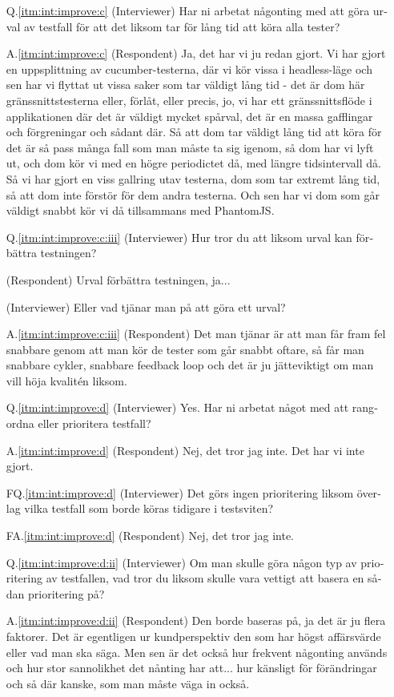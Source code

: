 \begin{otherlanguage}{swedish}
\begin{itemize}
  \item[Q.\ref{itm:int:improve:c}] (Interviewer) Har ni arbetat någonting med att göra urval av testfall för att det liksom tar för lång tid att köra alla tester?
  \item[A.\ref{itm:int:improve:c}] (Respondent) Ja, det har vi ju redan gjort. Vi har gjort en uppsplittning av cucumber-testerna, där vi kör vissa i headless-läge och sen har vi flyttat ut vissa saker som tar väldigt lång tid - det är dom här gränssnittstesterna eller, förlåt, eller precis, jo, vi har ett gränssnittsflöde i applikationen där det är väldigt mycket spårval, det är en massa gafflingar och förgreningar och sådant där. Så att dom tar väldigt lång tid att köra för det är så pass många fall som man måste ta sig igenom, så dom har vi lyft ut, och dom kör vi med en högre periodictet då, med längre tidsintervall då. Så vi har gjort en viss gallring utav testerna, dom som tar extremt lång tid, så att dom inte förstör för dem andra testerna. Och sen har vi dom som går väldigt snabbt kör vi då tillsammans med PhantomJS. 
  
  \item[Q.\ref{itm:int:improve:c:iii}] (Interviewer) Hur tror du att liksom urval kan förbättra testningen? 
  \item[] (Respondent) Urval förbättra testningen, ja...
  \item[] (Interviewer) Eller vad tjänar man på att göra ett urval?
  \item[A.\ref{itm:int:improve:c:iii}] (Respondent) Det man tjänar är att man får fram fel snabbare genom att man kör de tester som går snabbt oftare, så får man snabbare cykler, snabbare feedback loop och det är ju jätteviktigt om man vill höja kvalitén liksom.
  
  \item[Q.\ref{itm:int:improve:d}] (Interviewer) Yes. Har ni arbetat något med att rangordna eller prioritera testfall?
  \item[A.\ref{itm:int:improve:d}] (Respondent) Nej, det tror jag inte. Det har vi inte gjort.
  \item[FQ.\ref{itm:int:improve:d}] (Interviewer) Det görs ingen prioritering liksom överlag vilka testfall som borde köras tidigare i testsviten? 
  \item[FA.\ref{itm:int:improve:d}] (Respondent) Nej, det tror jag inte.
  
  \item[Q.\ref{itm:int:improve:d:ii}] (Interviewer) Om man skulle göra någon typ av prioritering av testfallen, vad tror du liksom skulle vara vettigt att basera en sådan prioritering på?
  \item[A.\ref{itm:int:improve:d:ii}] (Respondent) Den borde baseras på, ja det är ju flera faktorer. Det är egentligen ur kundperspektiv den som har högst affärsvärde eller vad man ska säga. Men sen är det också hur frekvent någonting används och hur stor sannolikhet det nånting har att... hur känsligt för förändringar och så där kanske, som man måste väga in också.
  

\end{itemize}
\end{otherlanguage}
